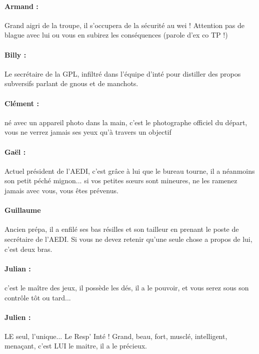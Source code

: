 \paragraph{Armand :} Grand aigri de la troupe, il s'occupera de la sécurité au wei ! Attention pas de blague avec lui ou vous en subirez les conséquences (parole d'ex co TP !)

\paragraph{Billy :} Le secrétaire de la GPL, infiltré dans l'équipe d'inté pour distiller des propos subversifs parlant de gnous et de manchots.

\paragraph{Clément :} né avec un appareil photo dans la main, c'est le photographe officiel du départ, vous ne verrez jamais ses yeux qu'à travers un objectif

\paragraph{Gaël :} Actuel président de l'AEDI, c'est grâce à lui que le bureau tourne, il a néanmoins son petit péché mignon... si vos petites sœurs sont mineures, ne les ramenez jamais avec vous, vous êtes prévenus.

\paragraph{Guillaume} Ancien prépa, il a enfilé ses bas résilles et son tailleur en prenant le poste de secrétaire de l'AEDI. Si vous ne devez retenir qu'une seule chose a propos de lui, c'est deux bras.

\paragraph{Julian :} c'est le maître des jeux, il possède les dés, il a le pouvoir, et vous serez sous son contrôle tôt ou tard...
\clearpage
{}
\paragraph{Julien :}  LE seul, l'unique... Le Resp' Inté ! Grand, beau, fort, musclé, intelligent, menaçant, c'est LUI le maitre, il a le précieux.
